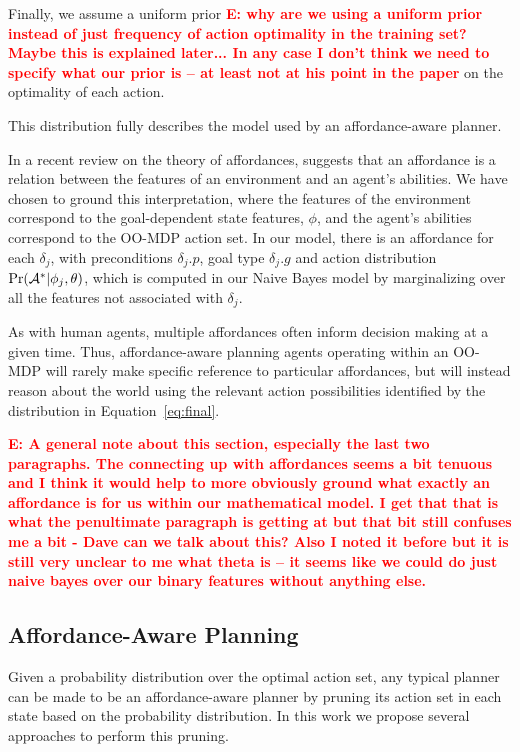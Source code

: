 \documentclass[conference]{IEEEtran}
\newcommand{\enote}[1]{\textcolor{Red}{\textbf{E: #1}}}
\begin{document}
Finally, we assume a uniform prior \enote{why are we using a uniform prior instead of just frequency of action optimality in the training set? Maybe this is explained later... In any case I don't think we need to specify what our prior is -- at least not at his point in the paper} on the optimality of
each action.

This distribution fully describes the model used by an affordance-aware planner. 

In a recent review on the theory of affordances, \citet{chemero2003} suggests that an affordance
is a relation between the features of an environment and an agent's abilities. We have chosen to
ground this interpretation, where the features of the environment correspond to the goal-dependent
state features, $\phi$, and the agent's abilities correspond to the OO-MDP action set. In our model,
there is an affordance for each $\delta_j$, with preconditions $\delta_j.p$, goal type $\delta_j.g$ and
action distribution $\Pr({\cal A}^* | \phi_j, \theta)$, which is computed in our Naive Bayes model by
marginalizing over all the features not associated with $\delta_j$.
  
As with human agents, multiple affordances often inform decision making at a given time.
Thus, affordance-aware planning agents operating within an OO-MDP will rarely make specific
reference to particular affordances, but will instead reason about the world using the relevant
action possibilities identified by the distribution in Equation~\ref{eq:final}. 

\enote{A general note about this section, especially the last two paragraphs. The connecting up with affordances seems a bit tenuous and I think it would help to more obviously ground what exactly an affordance is for us within our mathematical model. I get that that is what the penultimate paragraph is getting at but that bit still confuses me a bit - Dave can we talk about this? Also I noted it before but it is still very unclear to me what theta is -- it seems like we could do just naive bayes over our binary features without anything else.}

\subsection{Affordance-Aware Planning}
\label{sec:action_pruning}
Given a probability distribution over the optimal action set, any typical
planner can be made to be an affordance-aware planner by pruning its action
set in each state based on the probability distribution. In this work we propose several
approaches to perform this pruning.
\end{document}
